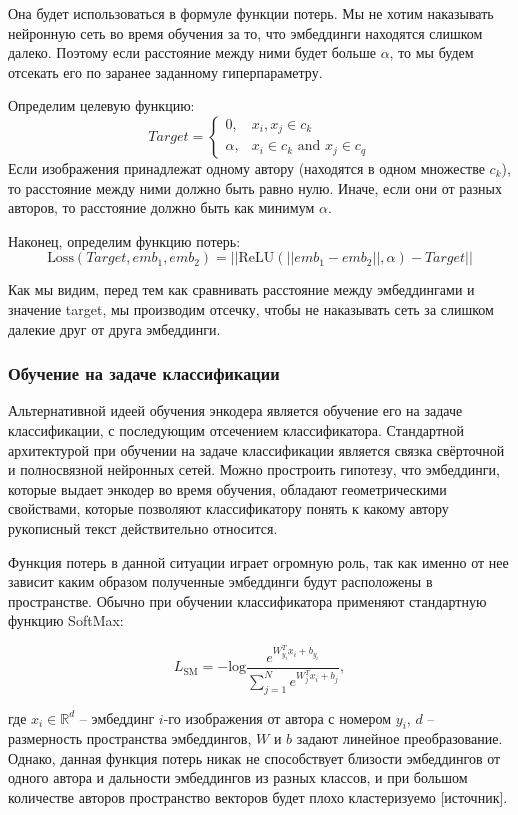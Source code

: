 \bigbreak
\noindent
Она будет использоваться в формуле функции потерь. Мы не хотим наказывать нейронную сеть во время обучения за то, что эмбеддинги находятся слишком далеко. Поэтому если расстояние между ними будет больше $\alpha$, то мы будем отсекать его по заранее заданному гиперпараметру. 

\noindent
Определим целевую функцию:
$$
Target =
\begin{cases}
    0,& x_i, x_j \in c_k \\
    \alpha,& x_i \in c_k \text{ and } x_j \in c_q
\end{cases}
$$
Если изображения принадлежат одному автору (находятся в одном множестве $c_k$), то расстояние между ними должно быть равно нулю. Иначе, если они от разных авторов, то расстояние должно быть как минимум $\alpha$. 

\noindent
Наконец, определим функцию потерь:
$$\text{Loss}(Target, emb_1, emb_2) = ||\text{ReLU}(|| emb_1 - emb_2 ||, \alpha) - Target||$$

\noindent
Как мы видим, перед тем как сравнивать расстояние между эмбеддингами и значение target, мы производим отсечку, чтобы не наказывать сеть за слишком далекие друг от друга эмбеддинги.

\subsubsection{Обучение на задаче классификации}

Альтернативной идеей обучения энкодера является обучение его на задаче классификации, с последующим отсечением классификатора. Стандартной архитектурой при обучении на задаче классификации является связка свёрточной и полносвязной нейронных сетей. Можно простроить гипотезу, что эмбеддинги, которые выдает энкодер во время обучения, обладают геометрическими свойствами, которые позволяют классификатору понять к какому автору рукописный текст действительно относится.

Функция потерь в данной ситуации играет огромную роль, так как именно от нее зависит каким образом полученные эмбеддинги будут расположены в пространстве. Обычно при обучении классификатора применяют стандартную функцию SoftMax:

$$
L_{\text{SM}} = -\text{log} \frac{e^{W_{y_i}^T x_i + b_{y_i}}}{\sum_{j=1}^{N} e^{W_{j}^T x_i + b_{j}}},
$$
\smallskip

\noindent
где $x_i \in \mathbb{R}^d$ -- эмбеддинг $i$-го изображения от автора с номером $y_i$, $d$ -- размерность пространства эмбеддингов, $W$ и $b$ задают линейное преобразование. Однако, данная функция потерь никак не способствует близости эмбеддингов от одного автора и дальности эмбеддингов из разных классов, и при большом количестве авторов пространство векторов будет плохо кластеризуемо [источник]. 

